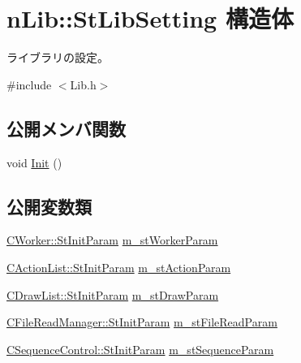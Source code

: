 \hypertarget{structn_lib_1_1_st_lib_setting}{}\section{n\+Lib\+:\+:St\+Lib\+Setting 構造体}
\label{structn_lib_1_1_st_lib_setting}


ライブラリの設定。  




{\ttfamily \#include $<$Lib.\+h$>$}

\subsection*{公開メンバ関数}
\begin{DoxyCompactItemize}
\item 
void \hyperlink{structn_lib_1_1_st_lib_setting_abfef2a9a3a680a8623c36934552a14a8}{Init} ()
\end{DoxyCompactItemize}
\subsection*{公開変数類}
\begin{DoxyCompactItemize}
\item 
\hyperlink{struct_c_worker_1_1_st_init_param}{C\+Worker\+::\+St\+Init\+Param} \hyperlink{structn_lib_1_1_st_lib_setting_a849353b655516d16bb7c74d26713aa5e}{m\+\_\+st\+Worker\+Param}
\item 
\hyperlink{struct_c_action_list_1_1_st_init_param}{C\+Action\+List\+::\+St\+Init\+Param} \hyperlink{structn_lib_1_1_st_lib_setting_a5c91592ac1acd5926b97b623ebc292cd}{m\+\_\+st\+Action\+Param}
\item 
\hyperlink{struct_c_draw_list_1_1_st_init_param}{C\+Draw\+List\+::\+St\+Init\+Param} \hyperlink{structn_lib_1_1_st_lib_setting_aac4349f6f2830386c5243828c2e60899}{m\+\_\+st\+Draw\+Param}
\item 
\hyperlink{struct_c_file_read_manager_1_1_st_init_param}{C\+File\+Read\+Manager\+::\+St\+Init\+Param} \hyperlink{structn_lib_1_1_st_lib_setting_a2ae2236932650acb41b9dce9d5af8885}{m\+\_\+st\+File\+Read\+Param}
\item 
\hyperlink{struct_c_sequence_control_1_1_st_init_param}{C\+Sequence\+Control\+::\+St\+Init\+Param} \hyperlink{structn_lib_1_1_st_lib_setting_a8b9241564d945e851cc42a6367f00629}{m\+\_\+st\+Sequence\+Param}
\end{DoxyCompactItemize}


